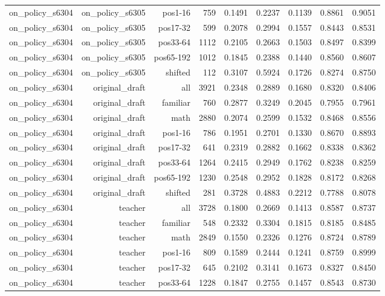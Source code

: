 \begin{tabular}{lrrrrrrrr}
on\_policy\_s6304 & on\_policy\_s6305 & pos1-16 & 759 & 0.1491 & 0.2237 & 0.1139 & 0.8861 & 0.9051 \\
on\_policy\_s6304 & on\_policy\_s6305 & pos17-32 & 599 & 0.2078 & 0.2994 & 0.1557 & 0.8443 & 0.8531 \\
on\_policy\_s6304 & on\_policy\_s6305 & pos33-64 & 1112 & 0.2105 & 0.2663 & 0.1503 & 0.8497 & 0.8399 \\
on\_policy\_s6304 & on\_policy\_s6305 & pos65-192 & 1012 & 0.1845 & 0.2388 & 0.1440 & 0.8560 & 0.8607 \\
on\_policy\_s6304 & on\_policy\_s6305 & shifted & 112 & 0.3107 & 0.5924 & 0.1726 & 0.8274 & 0.8750 \\
on\_policy\_s6304 & original\_draft & all & 3921 & 0.2348 & 0.2889 & 0.1680 & 0.8320 & 0.8406 \\
on\_policy\_s6304 & original\_draft & familiar & 760 & 0.2877 & 0.3249 & 0.2045 & 0.7955 & 0.7961 \\
on\_policy\_s6304 & original\_draft & math & 2880 & 0.2074 & 0.2599 & 0.1532 & 0.8468 & 0.8556 \\
on\_policy\_s6304 & original\_draft & pos1-16 & 786 & 0.1951 & 0.2701 & 0.1330 & 0.8670 & 0.8893 \\
on\_policy\_s6304 & original\_draft & pos17-32 & 641 & 0.2319 & 0.2882 & 0.1662 & 0.8338 & 0.8362 \\
on\_policy\_s6304 & original\_draft & pos33-64 & 1264 & 0.2415 & 0.2949 & 0.1762 & 0.8238 & 0.8259 \\
on\_policy\_s6304 & original\_draft & pos65-192 & 1230 & 0.2548 & 0.2952 & 0.1828 & 0.8172 & 0.8268 \\
on\_policy\_s6304 & original\_draft & shifted & 281 & 0.3728 & 0.4883 & 0.2212 & 0.7788 & 0.8078 \\
on\_policy\_s6304 & teacher & all & 3728 & 0.1800 & 0.2669 & 0.1413 & 0.8587 & 0.8737 \\
on\_policy\_s6304 & teacher & familiar & 548 & 0.2332 & 0.3304 & 0.1815 & 0.8185 & 0.8485 \\
on\_policy\_s6304 & teacher & math & 2849 & 0.1550 & 0.2326 & 0.1276 & 0.8724 & 0.8789 \\
on\_policy\_s6304 & teacher & pos1-16 & 809 & 0.1589 & 0.2444 & 0.1241 & 0.8759 & 0.8999 \\
on\_policy\_s6304 & teacher & pos17-32 & 645 & 0.2102 & 0.3141 & 0.1673 & 0.8327 & 0.8450 \\
on\_policy\_s6304 & teacher & pos33-64 & 1228 & 0.1847 & 0.2755 & 0.1457 & 0.8543 & 0.8730 \\

\end{tabular}
